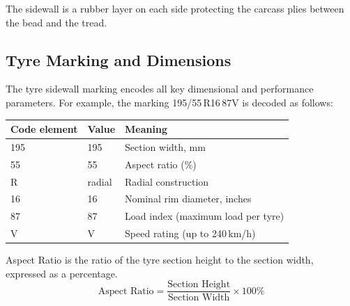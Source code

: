 \documentclass[10pt,a4paper]{article}
\begin{document}
The sidewall is a rubber layer on each side protecting the carcass plies between the bead and the tread.

\subsection{Tyre Marking and Dimensions}

The tyre sidewall marking encodes all key dimensional and performance parameters. For example, the marking 195/55\,R16\,87V is decoded as follows:

\begin{center}\small
\begin{tabular}{@{}lll@{}}
\toprule
Code element & Value & Meaning \\
\midrule
195 & 195 & Section width, mm \\
55 & 55 & Aspect ratio (\%) \\
R & radial & Radial construction \\
16 & 16 & Nominal rim diameter, inches \\
87 & 87 & Load index (maximum load per tyre) \\
V & V & Speed rating (up to 240\,km/h) \\
\bottomrule
\end{tabular}
\end{center}

\begin{eqnbox}
Aspect Ratio is the ratio of the tyre section height to the section width, expressed as a percentage.
\begin{equation}
\text{Aspect Ratio} = \frac{\text{Section Height}}{\text{Section Width}} \times 100\%
\end{equation}
\begin{varlist}
\end{varlist}
\end{eqnbox}
\end{document}
